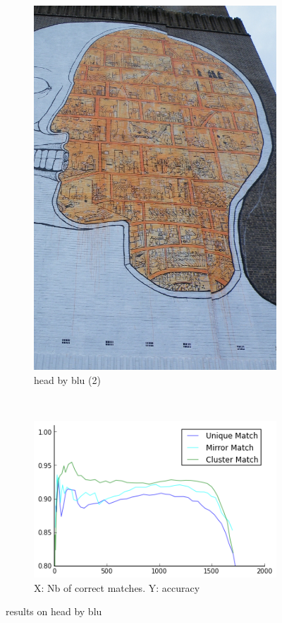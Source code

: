 \documentclass{article}
\begin{document}
\begin{figure}
{\begin{subfigure}[t]{0.25\textwidth}
			\includegraphics[width=\textwidth]{images/blu_head_2}
			\caption{head by blu (2)}
			\label{fig:head2}
		\end{subfigure}%
		~ %
		\begin{subfigure}[t]{0.55\textwidth}
			\centering
			\includegraphics[width=\textwidth]{images/result_blu_head}
			\caption{X: Nb of correct matches. Y: accuracy}
			\label{fig:result_head}
		\end{subfigure}%
	}%
	\label{fig:head}
	\caption{results on head by blu}
\end{figure}
\end{document}
